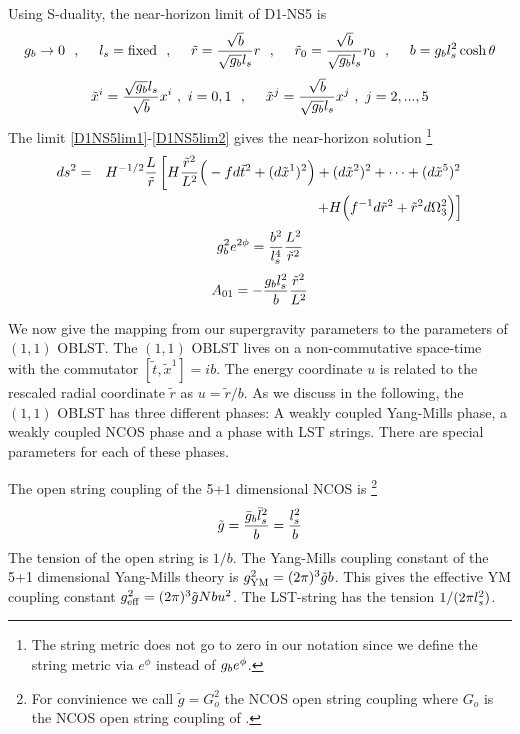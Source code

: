 \documentclass[a4paper,twoside,titlepage,12pt]{article}
\begin{document}
Using S-duality, the near-horizon limit of D1-NS5 is
%
\begin{equation}
\label{D1NS5lim1}
g_b \rightarrow 0 \ \ ,\ \ \ \ 
l_s = \mbox{fixed} \ \ ,\ \ \ \ 
\tilde{r} = \frac{\sqrt{b}}{\sqrt{g_b} l_s} r \ \ ,\ \ \ \ 
\tilde{r}_0 = \frac{\sqrt{b}}{\sqrt{g_b} l_s} r_0 \ \ ,\ \ \ \ 
b = g_b l_s^2 \cosh \theta 
\end{equation}
%
\begin{equation}
\label{D1NS5lim2}
\tilde{x}^i = \frac{\sqrt{\gsnb} \lsn}{\sqrt{b}} x^i \ , \ i=0,1 \spa
\tilde{x}^j = \frac{\sqrt{b}}{\sqrt{\gsnb} \lsn} x^j \ , \ j=2,...,5 
\end{equation}
%
The limit \eqref{D1NS5lim1}-\eqref{D1NS5lim2} 
gives the near-horizon solution%
\footnote{The string metric does not go to zero in our notation since
we define the string metric via \( e^{\phi} \) instead 
of \( g_b e^{\phi} \).}
%
\begin{eqnarray}
\label{NHD1NS5met}
ds^2 &=& H^{-1/2} \frac{L}{\tilde{r}} \left[ H \frac{\tilde{r}^2}{L^2} 
\Big( - f d\tilde{t}^2 + (d\tilde{x}^1)^2 \Big)
+ (d\tilde{x}^2)^2 + \cdots + (d\tilde{x}^5)^2 
\right. \nonumber \\ && \left.
+ H \Big( f^{-1} d\tilde{r}^2 + \tilde{r}^2 d\Omega_3^2 \Big) \right]
\end{eqnarray}
%
\begin{equation}
\label{NHD1NS5dil}
g_b^2 e^{2\phi} 
= \frac{b^2}{l_s^4} \frac{L^2}{\tilde{r}^2}
\end{equation}
%
\begin{equation}
\label{NHD1NS5pot}
A_{01} = - \frac{g_b l_s^2}{b} \frac{\tilde{r}^2}{L^2}
\end{equation}
%

We now give the mapping from our supergravity parameters to the
parameters of $(1,1)$ OBLST.
The $(1,1)$ OBLST lives on a non-commutative space-time with the commutator
$[\tilde{t},\tilde{x}^1]=ib$.
The energy coordinate $u$ is related to the rescaled radial
coordinate $\tilde{r}$ as $u = \tilde{r}/b$.
As we discuss in the following, the $(1,1)$ OBLST has three different
phases: A weakly coupled Yang-Mills phase, 
a weakly coupled NCOS phase and a phase with LST strings. 
There are special parameters for each of these phases.

The open string coupling of the 5+1 dimensional NCOS 
is \cite{Gopakumar:2000na}%
\footnote{For convinience we call $\tilde{g} = G_o^2$ 
the NCOS open string coupling where $G_o$ is the NCOS open string coupling
of \cite{Gopakumar:2000na}.}
%
\begin{equation}
\tilde{g} = \frac{\bar{g}_b \bar{l}_s^2}{b} = \frac{l_s^2}{b}
\end{equation}
%
The tension of the open string is $1/b$.
The Yang-Mills coupling constant of the 5+1 dimensional Yang-Mills theory is
$g_{\mathrm{YM}}^2 = (2\pi)^3 \tilde{g} b $. This gives the
effective YM coupling constant $g_{\mathrm{eff}}^2 = (2\pi)^3 \tilde{g} N b u^2 $.
The LST-string has the tension \( 1/(2\pi l_s^2 ) \).
\end{document}
